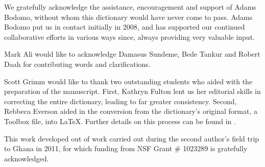 \begin{refsection}



We gratefully acknowledge the assistance, encouragement and support of Adams Bodomo, without whom this dictionary would have never come to pass.  Adams Bodomo put us in contact initially in 2008, and has supported our continued collaborative efforts in various ways since, always providing very valuable input.  


Mark Ali would like to acknowledge Damasus Sundeme, Bede Tankur and Robert Daah for contributing words and clarifications.

Scott Grimm would like to thank two outstanding students who aided with the preparation of the manuscript.  First, Kathryn Fulton lent us her editorial skills in correcting the entire dictionary, leading to far greater consistency.  Second, Rebbeca Everson aided in the conversion from the dictionary's original format, a Toolbox file, into \LaTeX.  Further details on this process can be found in \citet{EversonGrimm2017}.


This work developed out of work carried out during the second author’s field trip to Ghana in 2011, for which funding from NSF Grant \# 1023289 is gratefully acknowledged.

\printbibliography[heading=subbibliography]
\end{refsection}